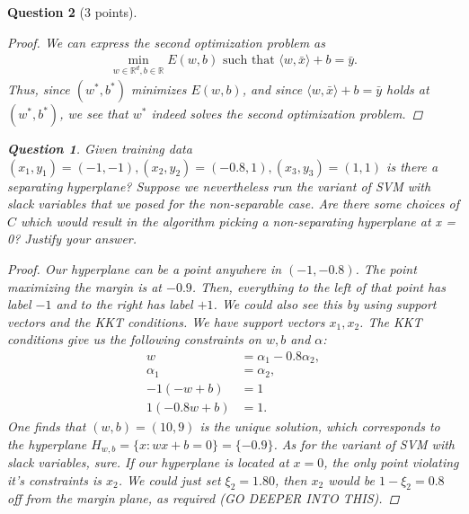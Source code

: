 \documentclass[12pt]{article}
\newcommand{\real}{\mathbb{R}}
\newcommand\set[1]{\{#1\}}
\newtheorem{question}{Question}
\begin{document}
\begin{question}[3 points]
\begin{proof}
    We can express the second optimization problem as
    \begin{align*}
      \min\limits_{w \in \real^d, b \in \real} E(w,b) \text{ such that } \langle w, \bar{x} \rangle + b = \bar{y}.
    \end{align*}
    Thus, since $(w^*, b^*)$ minimizes $E(w,b)$, and since $\langle w, \bar{x} \rangle + b = \bar{y}$ holds at $(w^*, b^*)$, we see that $w^*$ indeed solves the second optimization problem.
  \end{proof}
  \begin{question}
    Given training data $(x_1, y_1) = (-1, -1), (x_2, y_2) = (-0.8, 1), (x_3, y_3) = (1,1)$ is there a separating hyperplane? Suppose we nevertheless run the variant of SVM with slack variables that we posed for the non-separable case. Are there some choices of $C$ which would result in the algorithm picking a non-separating hyperplane at x = 0? Justify your answer.
    
  \end{question}
  \begin{proof}
    Our hyperplane can be a point anywhere in $(-1, -0.8)$. The point maximizing the margin is at $-0.9$. Then, everything to the left of that point has label $-1$ and to the right has label $+1$. We could also see this by using support vectors and the KKT conditions. We have support vectors $x_1, x_2$. The KKT conditions give us the following constraints on $w,b$ and $\alpha$:
    \begin{align*}
      w &= \alpha_1 - 0.8\alpha_2, \\
      \alpha_1 &= \alpha_2, \\
      -1(-w + b) &= 1 \\
      1(-0.8w + b) &= 1 .
    \end{align*}
    One finds that $(w,b)=(10,9)$ is the unique solution, which corresponds to the hyperplane $H_{w,b} = \set{x: wx+b = 0} = \set{-0.9}$.
    \bigbreak
    As for the variant of SVM with slack variables, sure. If our hyperplane is located at $x=0$, the only point violating it's constraints is $x_2$. We could just set $\xi_2 = 1.80$, then $x_2$ would be $1-\xi_2 = 0.8$ off from the margin plane, as required (GO DEEPER INTO THIS).
  \end{proof}
\end{question}
\end{document}
